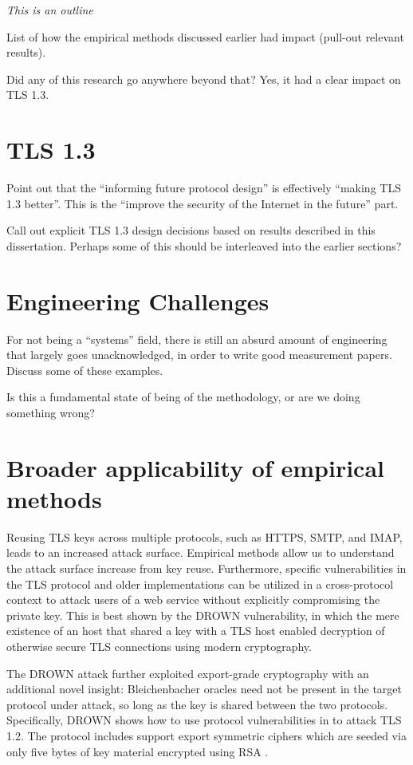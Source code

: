 \textit{This is an outline}

List of how the empirical methods discussed earlier had impact
(pull-out relevant results).

Did any of this research go anywhere beyond that? Yes, it had a clear impact
on TLS 1.3.

\section{TLS 1.3}

Point out that the ``informing future protocol design'' is effectively
``making TLS 1.3 better''. This is the ``improve the security of the Internet
in the future'' part.

Call out explicit TLS 1.3 design decisions based on results described in this
dissertation. Perhaps some of this should be interleaved into the earlier
sections?

\section{Engineering Challenges}

For not being a ``systems'' field, there is still an absurd amount of
engineering that largely goes unacknowledged, in order to write good
measurement papers. Discuss some of these examples.

Is this a fundamental state of being of the methodology, or are we doing something wrong?

\section{Broader applicability of empirical methods}

Reusing TLS keys across multiple protocols, such as HTTPS, SMTP, and IMAP,
leads to an increased attack surface. Empirical methods allow us to understand
the attack surface increase from key reuse. Furthermore, specific
vulnerabilities in the TLS protocol and older implementations can be utilized
in a cross-protocol context to attack users of a web service without explicitly
compromising the private key. This is best shown by the DROWN vulnerability, in
which the mere existence of an \ssltwo host that shared a key with a TLS host
enabled decryption of otherwise secure TLS connections using modern
cryptography.

The DROWN attack further exploited export-grade cryptography with an additional
novel insight: Bleichenbacher oracles need not be present in the target
protocol under attack, so long as the key is shared between the two protocols.
Specifically, DROWN shows how to use protocol vulnerabilities in \ssltwo to
attack TLS 1.2. The \ssltwo protocol includes support export symmetric ciphers
which are seeded via only five bytes of key material encrypted using RSA \PKCS.

